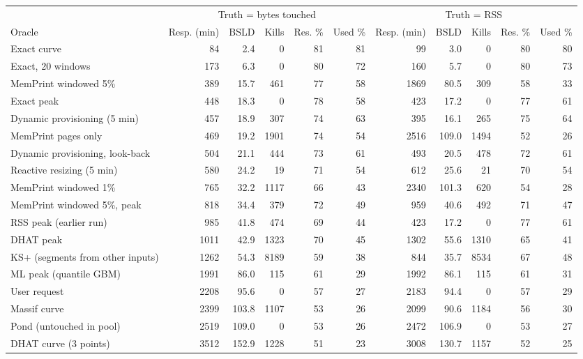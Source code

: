 \begin{tabular}{lrrrrrrrrrr}
\toprule
 & \multicolumn{5}{c}{Truth = bytes touched} & \multicolumn{5}{c}{Truth = RSS} \\
\cmidrule(lr){2-6} \cmidrule(lr){7-11}
Oracle & Resp. (min) & BSLD & Kills & Res. \% & Used \% & Resp. (min) & BSLD & Kills & Res. \% & Used \% \\
\midrule
Exact curve & 84 & 2.4 & 0 & 81 & 81 & 99 & 3.0 & 0 & 80 & 80 \\
Exact, 20 windows & 173 & 6.3 & 0 & 80 & 72 & 160 & 5.7 & 0 & 80 & 73 \\
MemPrint windowed 5\% & 389 & 15.7 & 461 & 77 & 58 & 1869 & 80.5 & 309 & 58 & 33 \\
Exact peak & 448 & 18.3 & 0 & 78 & 58 & 423 & 17.2 & 0 & 77 & 61 \\
Dynamic provisioning (5 min) & 457 & 18.9 & 307 & 74 & 63 & 395 & 16.1 & 265 & 75 & 64 \\
MemPrint pages only & 469 & 19.2 & 1901 & 74 & 54 & 2516 & 109.0 & 1494 & 52 & 26 \\
Dynamic provisioning, look-back & 504 & 21.1 & 444 & 73 & 61 & 493 & 20.5 & 478 & 72 & 61 \\
Reactive resizing (5 min) & 580 & 24.2 & 19 & 71 & 54 & 612 & 25.6 & 21 & 70 & 54 \\
MemPrint windowed 1\% & 765 & 32.2 & 1117 & 66 & 43 & 2340 & 101.3 & 620 & 54 & 28 \\
MemPrint windowed 5\%, peak & 818 & 34.4 & 379 & 72 & 49 & 959 & 40.6 & 492 & 71 & 47 \\
RSS peak (earlier run) & 985 & 41.8 & 474 & 69 & 44 & 423 & 17.2 & 0 & 77 & 61 \\
DHAT peak & 1011 & 42.9 & 1323 & 70 & 45 & 1302 & 55.6 & 1310 & 65 & 41 \\
KS+ (segments from other inputs) & 1262 & 54.3 & 8189 & 59 & 38 & 844 & 35.7 & 8534 & 67 & 48 \\
ML peak (quantile GBM) & 1991 & 86.0 & 115 & 61 & 29 & 1992 & 86.1 & 115 & 61 & 31 \\
User request & 2208 & 95.6 & 0 & 57 & 27 & 2183 & 94.4 & 0 & 57 & 29 \\
Massif curve & 2399 & 103.8 & 1107 & 53 & 26 & 2099 & 90.6 & 1184 & 56 & 30 \\
Pond (untouched in pool) & 2519 & 109.0 & 0 & 53 & 26 & 2472 & 106.9 & 0 & 53 & 27 \\
DHAT curve (3 points) & 3512 & 152.9 & 1228 & 51 & 23 & 3008 & 130.7 & 1157 & 52 & 25 \\

\end{tabular}
